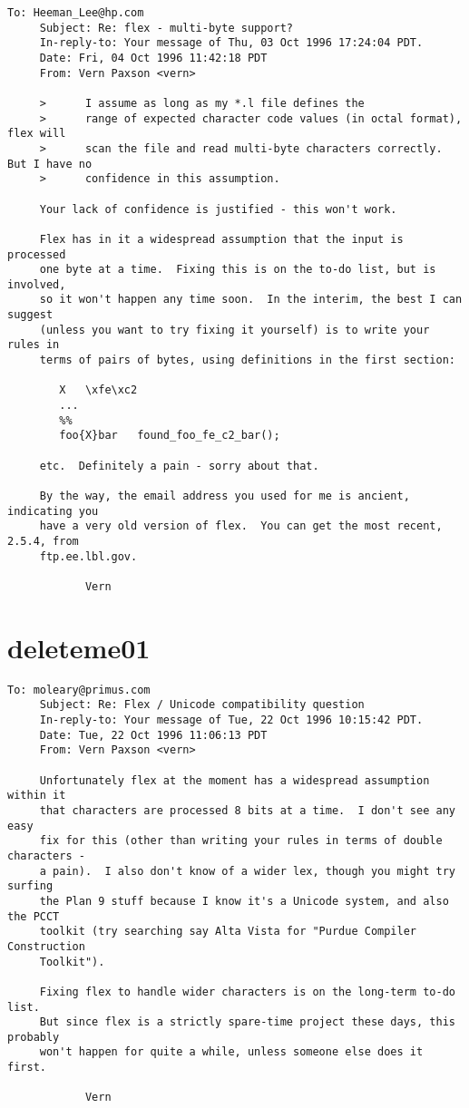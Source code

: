 \documentclass[openany,oneside]{book}
\begin{document}
\begin{verbatim}
To: Heeman_Lee@hp.com
     Subject: Re: flex - multi-byte support?
     In-reply-to: Your message of Thu, 03 Oct 1996 17:24:04 PDT.
     Date: Fri, 04 Oct 1996 11:42:18 PDT
     From: Vern Paxson <vern>
     
     >      I assume as long as my *.l file defines the
     >      range of expected character code values (in octal format), flex will
     >      scan the file and read multi-byte characters correctly. But I have no
     >      confidence in this assumption.
     
     Your lack of confidence is justified - this won't work.
     
     Flex has in it a widespread assumption that the input is processed
     one byte at a time.  Fixing this is on the to-do list, but is involved,
     so it won't happen any time soon.  In the interim, the best I can suggest
     (unless you want to try fixing it yourself) is to write your rules in
     terms of pairs of bytes, using definitions in the first section:
     
     	X	\xfe\xc2
     	...
     	%%
     	foo{X}bar	found_foo_fe_c2_bar();
     
     etc.  Definitely a pain - sorry about that.
     
     By the way, the email address you used for me is ancient, indicating you
     have a very old version of flex.  You can get the most recent, 2.5.4, from
     ftp.ee.lbl.gov.
     
     		Vern
\end{verbatim}

\section{deleteme01}

\begin{verbatim}
To: moleary@primus.com
     Subject: Re: Flex / Unicode compatibility question
     In-reply-to: Your message of Tue, 22 Oct 1996 10:15:42 PDT.
     Date: Tue, 22 Oct 1996 11:06:13 PDT
     From: Vern Paxson <vern>
     
     Unfortunately flex at the moment has a widespread assumption within it
     that characters are processed 8 bits at a time.  I don't see any easy
     fix for this (other than writing your rules in terms of double characters -
     a pain).  I also don't know of a wider lex, though you might try surfing
     the Plan 9 stuff because I know it's a Unicode system, and also the PCCT
     toolkit (try searching say Alta Vista for "Purdue Compiler Construction
     Toolkit").
     
     Fixing flex to handle wider characters is on the long-term to-do list.
     But since flex is a strictly spare-time project these days, this probably
     won't happen for quite a while, unless someone else does it first.
     
     		Vern
\end{verbatim}
\end{document}
